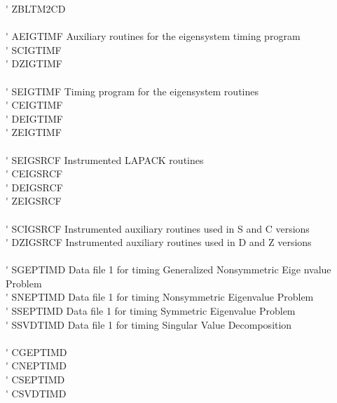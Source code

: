 \begin{tabbing}
 \> \titem \' \> ZBLTM2CD \> \\
\vspace{0.1ex} \\
 \> \titem \' \> AEIGTIMF\> Auxiliary routines for the eigensystem timing program \\
 \> \titem \' \> SCIGTIMF\> \\
 \> \titem \' \> DZIGTIMF\> \\
\vspace{0.1ex} \\
 \> \titem \' \> SEIGTIMF\> Timing program for the eigensystem routines \\
 \> \titem \' \> CEIGTIMF \> \\
 \> \titem \' \> DEIGTIMF \> \\
 \> \titem \' \> ZEIGTIMF \> \\
\vspace{0.1ex} \\
 \> \titem \' \> SEIGSRCF\> Instrumented LAPACK routines \\
 \> \titem \' \> CEIGSRCF \> \\
 \> \titem \' \> DEIGSRCF \> \\
 \> \titem \' \> ZEIGSRCF \> \\
\vspace{0.1ex} \\
 \> \titem \' \> SCIGSRCF\>  Instrumented auxiliary routines used in S
and C versions \\
 \> \titem \' \> DZIGSRCF \> Instrumented auxiliary routines used in D
and Z versions \\
\vspace{0.1ex} \\
 \> \titem \' \> SGEPTIMD\> Data file 1 for timing Generalized Nonsymmetric Eige
nvalue Problem \\
 \> \titem \' \> SNEPTIMD\> Data file 1 for timing Nonsymmetric Eigenvalue Problem \\
 \> \titem \' \> SSEPTIMD\> Data file 1 for timing Symmetric Eigenvalue Problem \\
 \> \titem \' \> SSVDTIMD\> Data file 1 for timing Singular Value Decomposition \\
\vspace{0.1ex} \\
 \> \titem \' \> CGEPTIMD \> \\
 \> \titem \' \> CNEPTIMD \> \\
 \> \titem \' \> CSEPTIMD \> \\
 \> \titem \' \> CSVDTIMD \> \\

\end{tabbing}
